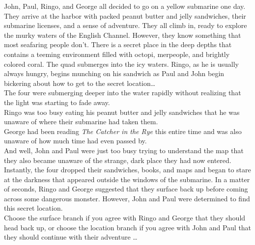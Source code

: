 \documentclass{article}
\begin{document}
John, Paul, Ringo, and George all decided to go on a yellow submarine one day.
They arrive at the harbor with packed peanut butter and jelly sandwiches,
their submarine licenses, and a sense of adventure.
They all climb in, ready to explore the murky waters of the English Channel.
However, they know something that most seafaring people don’t.
There is a secret place in the deep depths that contains a teeming environment
filled with octopi, merpeople, and brightly colored coral.
The quad submerges into the icy waters. Ringo, as he is usually always hungry,
begins munching on his sandwich as Paul and John begin bickering about how to
get to the secret location… \\

The four were submerging deeper into the water rapidly without realizing that
the light was starting to fade away.\\

Ringo was too busy eating his peanut butter and jelly sandwiches that he was
unaware of where their submarine had taken them.\\

George had been reading \textit{The Catcher in the Rye} this entire time and was
also unaware of how much time had even passed by.\\

And well, John and Paul were just too busy trying to understand the map that they
also became unaware of the strange, dark place they had now entered. \\

Instantly, the four dropped their sandwiches, books, and maps and began to stare
at the darkness that appeared outside the windows of the submarine. In a matter
of seconds, Ringo and George suggested that they surface back up before coming
across some dangerous monster. However, John and Paul were determined to find this
secret location.\\

Choose the surface branch if you agree with Ringo and George that they should
head back up, or choose the location branch if you agree with John and Paul that
they should continue with their adventure …
\end{document}
